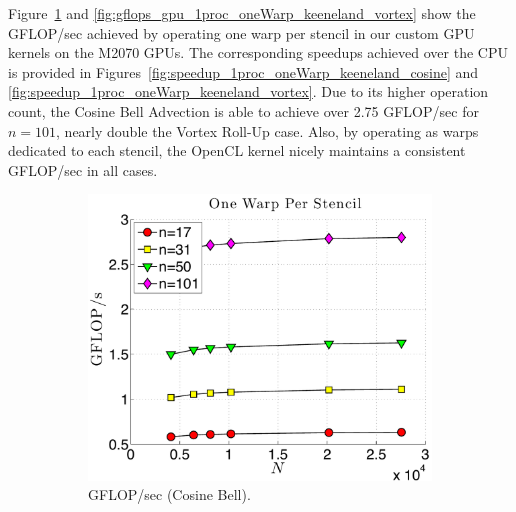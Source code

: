 Figure~\ref{fig:gflops_gpu_1proc_oneWarp_keeneland_cosine} and \ref{fig:gflops_gpu_1proc_oneWarp_keeneland_vortex} show the GFLOP/sec achieved by operating one warp per stencil in our custom GPU kernels on the M2070 GPUs. The corresponding speedups achieved over the CPU is provided in Figures~\ref{fig:speedup_1proc_oneWarp_keeneland_cosine} and \ref{fig:speedup_1proc_oneWarp_keeneland_vortex}. Due to its higher operation count, the Cosine Bell Advection is able to achieve over 2.75 GFLOP/sec for $n=101$, nearly double the Vortex Roll-Up case. Also, by operating as warps dedicated to each stencil, the OpenCL kernel nicely maintains a consistent GFLOP/sec in all cases. 


\begin{figure}
\centering
\begin{subfigure}[t]{0.46\textwidth}
\includegraphics[width=\textwidth]{../figures/keeneland_results/alltoallv_cosine/gflops_gpu_1proc_oneWarpPerStencil.pdf}
\caption{GFLOP/sec (Cosine Bell).}
\label{fig:gflops_gpu_1proc_oneWarp_keeneland_cosine}
\end{subfigure} 
\quad
\begin{subfigure}[t]{0.425\textwidth}

\end{subfigure}
\end{figure}
